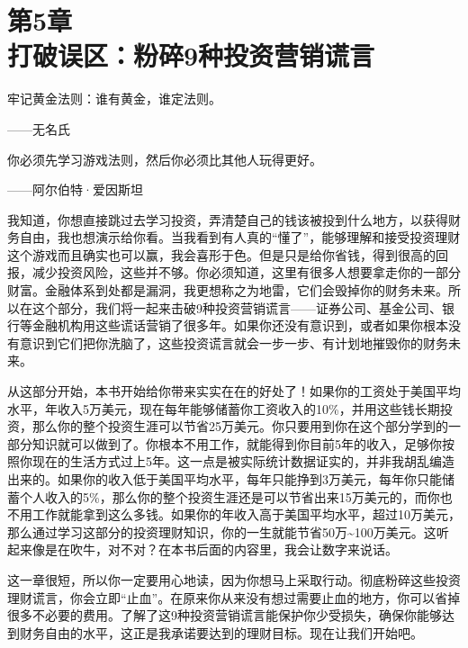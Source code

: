 
\section[第5章\q 打破误区：粉碎9种投资营销谎言]{第5章\\ 打破误区：粉碎9种投资营销谎言}

\begin{BookQuote}
牢记黄金法则：谁有黄金，谁定法则。

\hfill ——无名氏
\end{BookQuote}

\begin{BookQuote}
你必须先学习游戏法则，然后你必须比其他人玩得更好。

\hfill ——阿尔伯特·爱因斯坦
\end{BookQuote}

我知道，你想直接跳过去学习投资，弄清楚自己的钱该被投到什么地方，以获得财务自由，我也想演示给你看。当我看到有人真的“懂了”，能够理解和接受投资理财这个游戏而且确实也可以赢，我会喜形于色。但是只是给你省钱，得到很高的回报，减少投资风险，这些并不够。你必须知道，这里有很多人想要拿走你的一部分财富。金融体系到处都是漏洞，我更想称之为地雷，它们会毁掉你的财务未来。所以在这个部分，我们将一起来击破9种投资营销谎言——证券公司、基金公司、银行等金融机构用这些谎话营销了很多年。如果你还没有意识到，或者如果你根本没有意识到它们把你洗脑了，这些投资谎言就会一步一步、有计划地摧毁你的财务未来。

从这部分开始，本书开始给你带来实实在在的好处了！如果你的工资处于美国平均水平，年收入5万美元，现在每年能够储蓄你工资收入的10\%，并用这些钱长期投资，那么你的整个投资生涯可以节省25万美元。你只要用到你在这个部分学到的一部分知识就可以做到了。你根本不用工作，就能得到你目前5年的收入，足够你按照你现在的生活方式过上5年。这一点是被实际统计数据证实的，并非我胡乱编造出来的。如果你的收入低于美国平均水平，每年只能挣到3万美元，每年你只能储蓄个人收入的5\%，那么你的整个投资生涯还是可以节省出来15万美元的，而你也不用工作就能拿到这么多钱。如果你的年收入高于美国平均水平，超过10万美元，那么通过学习这部分的投资理财知识，你的一生就能节省50万\textasciitilde{}100万美元。这听起来像是在吹牛，对不对？在本书后面的内容里，我会让数字来说话。

这一章很短，所以你一定要用心地读，因为你想马上采取行动。彻底粉碎这些投资理财谎言，你会立即“止血”。在原来你从来没有想过需要止血的地方，你可以省掉很多不必要的费用。了解了这9种投资营销谎言能保护你少受损失，确保你能够达到财务自由的水平，这正是我承诺要达到的理财目标。现在让我们开始吧。


